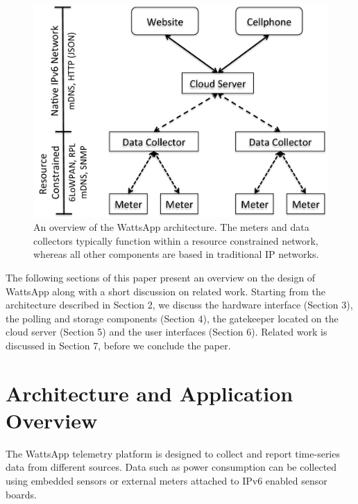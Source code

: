 \documentclass[10pt, conference, compsocconf]{IEEEtran}
\begin{document}
\begin{figure}[t]
\begin{centering}
\includegraphics[scale=0.4]{images/wattsapp-overview} 
\par\end{centering}

\caption{An overview of the WattsApp architecture. The meters and data collectors
typically function within a resource constrained network, whereas
all other components are based in traditional IP networks.\label{fig:wattsapp}}
\end{figure}


The following sections of this paper present an overview on the design
of WattsApp along with a short discussion on related work. Starting
from the architecture described in Section 2, we discuss the hardware
interface (Section 3), the polling and storage components (Section
4), the gatekeeper located on the cloud server (Section 5) and the
user interfaces (Section 6). Related work is discussed in Section
7, before we conclude the paper.


\section{Architecture and Application Overview}

The WattsApp telemetry platform is designed to collect and report
time-series data from different sources. Data such as power consumption
can be collected using embedded sensors or external meters attached
to IPv6 enabled sensor boards.
\end{document}
